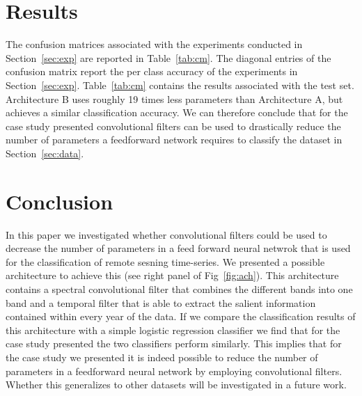 \documentclass{article}
\begin{document}
\section{Results}
\label{sec:results}
The confusion matrices associated with the experiments conducted in Section~\ref{sec:exp} are reported in Table~\ref{tab:cm}. The diagonal entries of the confusion matrix report the per class accuracy of the experiments in Section~\ref{sec:exp}. Table~\ref{tab:cm} contains the results associated with the test set. Architecture B uses roughly 19 times less parameters than Architecture A, but achieves a similar classification accuracy. We can therefore conclude that for the case study presented  convolutional filters can be used to drastically reduce the number of parameters a feedforward network requires to  classify the dataset in Section~\ref{sec:data}. 

\section{Conclusion}
In this paper we investigated whether convolutional filters could be used to decrease the number of parameters in a feed forward neural netwrok that is used for the classification of remote sesning time-series. We presented a possible architecture to achieve this (see right panel of Fig~\ref{fig:ach}). This architecture contains a spectral convolutional filter that combines the different bands into one band and a temporal filter that is able to extract the salient information contained within every year of the data. If we compare the classification results of this architecture with a simple logistic regression classifier we find that for the case study presented the two classifiers perform similarly. This implies that for the case study we presented it is indeed possible to reduce the number of parameters in a feedforward neural network by employing convolutional filters. Whether this generalizes to other datasets will be investigated in a future work.  
\end{document}
